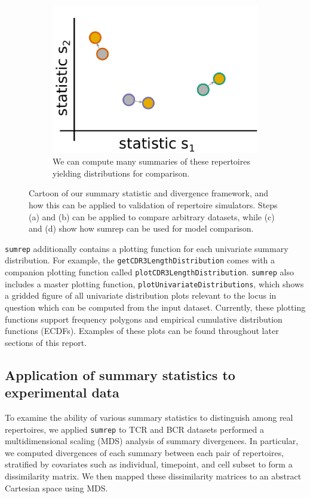 \documentclass{article}
\begin{document}
\begin{figure}
\begin{subfigure}[c]{0.48\linewidth}
\begin{center}
     	\includegraphics[width=\linewidth]{Figures/paired_summaries.pdf}
		\end{center}
		\caption{We can compute many summaries of these repertoires yielding distributions for comparison.}
		\label{fig:DataSimSummary}
    \end{subfigure}
    \caption{Cartoon of our summary statistic and divergence framework, and how this can be applied to validation of repertoire simulators. Steps (a) and (b) can be applied to compare arbitrary datasets, while (c) and (d) show how sumrep can be used for model comparison.}
    \label{fig:SummaryFramework}
\end{figure}

\texttt{sumrep} additionally contains a plotting function for each univariate summary distribution.
For example, the \texttt{getCDR3LengthDistribution} comes with a companion plotting function called \texttt{plotCDR3LengthDistribution}.
\texttt{sumrep} also includes a master plotting function, \texttt{plotUnivariateDistributions}, which shows a gridded figure of all univariate distribution plots relevant to the locus in question which can be computed from the input dataset.
Currently, these plotting functions support frequency polygons and empirical cumulative distribution functions (ECDFs).
Examples of these plots can be found throughout later sections of this report.

\subsection*{Application of summary statistics to experimental data}
To examine the ability of various summary statistics to distinguish among real repertoires, we applied \texttt{sumrep} to TCR and BCR datasets performed a multidimensional scaling (MDS) analysis of summary divergences.
In particular, we computed divergences of each summary between each pair of repertoires, stratified by covariates such as individual, timepoint, and cell subset to form a dissimilarity matrix.
We then mapped these dissimilarity matrices to an abstract Cartesian space using MDS.
\end{document}
